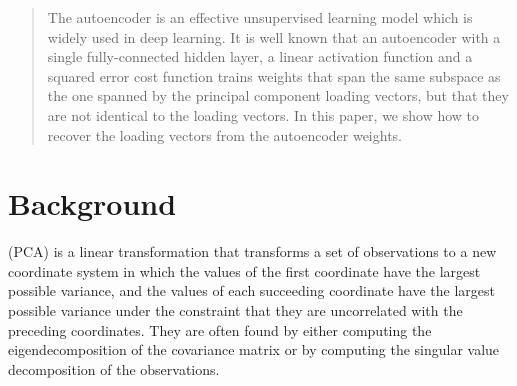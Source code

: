 \documentclass[journal]{IEEEtran}
\begin{document}





\maketitle

\begin{abstract}
The autoencoder is an effective unsupervised learning model which is widely used in deep learning. It is well known that an autoencoder with a single fully-connected hidden layer, a linear activation function and a squared error cost function trains weights that span the same subspace as the one spanned by the principal component loading vectors, but that they are not identical to the loading vectors. In this paper, we show how to recover the loading vectors from the autoencoder weights.
\end{abstract}


%
\IEEEpeerreviewmaketitle

\section{Background}
 (PCA) is a linear transformation that transforms a set of observations to a new coordinate system in which the values of the first coordinate have the largest possible variance, and the values of each succeeding coordinate have the largest possible variance under the constraint that they are uncorrelated with the preceding coordinates. They are often found by either computing the eigendecomposition of the covariance matrix or by computing the singular value decomposition of the observations.
\end{document}
